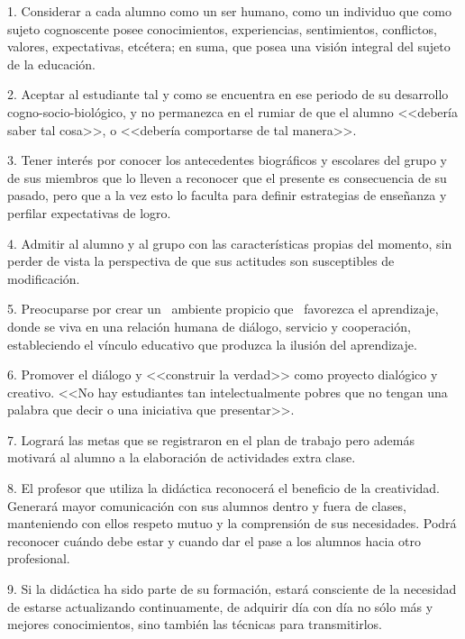 \begin{Obs} 
\item[1.] Considerar a cada alumno como un ser humano, como un individuo que 
como sujeto cognoscente posee conocimientos, experiencias, 
sentimientos, conflictos, valores, expectativas, etcétera; en suma, que 
posea una visión integral del sujeto de la educación.
\item[2.] Aceptar al estudiante tal y como se encuentra en ese periodo de su 
desarrollo cogno-socio-biológico, y no permanezca en el rumiar de que 
el alumno <<debería saber tal cosa>>, o <<debería comportarse de tal 
manera>>.
\item[3.] Tener interés por conocer los antecedentes biográficos y escolares 
del grupo y de sus miembros que lo lleven a reconocer que el presente 
es consecuencia de su pasado, pero que a la vez esto lo faculta para 
definir estrategias de enseñanza y perfilar expectativas de logro.
\item[4.] Admitir al alumno y al grupo con las características propias del 
momento, sin perder de vista la perspectiva de que sus actitudes son 
susceptibles de modificación.
\item[5.] Preocuparse por crear un \ ambiente propicio que \ fa\-vo\-rez\-ca el 
apren\-di\-za\-je, donde se viva en una relación humana de diálogo, servicio 
y cooperación, estableciendo el vínculo educativo que produzca la 
ilusión del aprendizaje.
\item[6.] Promover el diálogo y <<construir la verdad>> como proyecto dialógico y creativo. 
<<No hay estudiantes tan intelectualmente pobres que no tengan una palabra que decir o una iniciativa que presentar>>. 
\item[7.] Logrará las metas que se registraron en el plan de trabajo pero 
además motivará al alumno a la elaboración de actividades extra clase.
\item[8.] El profesor que utiliza la didáctica reconocerá el beneficio de la 
creatividad. Generará mayor comunicación con sus alumnos dentro y fuera 
de clases, manteniendo con ellos respeto mutuo y la comprensión de sus 
necesidades. Podrá reconocer cuándo debe estar y cuando dar el pase a 
los alumnos hacia otro profesional.
\enlargethispage{1\baselineskip}
\item[9.] Si la didáctica ha sido parte de su formación, estará consciente de 
la necesidad de estarse actualizando continuamente, de adquirir día con 
día no sólo más y mejores conocimientos, sino también las técnicas para 
transmitirlos.
\end{Obs}
 
